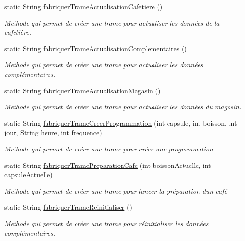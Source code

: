 \begin{DoxyCompactItemize}
static String \hyperlink{classcom_1_1example_1_1ekawa_1_1_protocole_a71e172b9adefa345ebff98663129f833}{fabriquer\+Trame\+Actualisation\+Cafetiere} ()
\begin{DoxyCompactList}\small\item\em Methode qui permet de créer une trame pour actualiser les données de la cafetière. \end{DoxyCompactList}\item 
static String \hyperlink{classcom_1_1example_1_1ekawa_1_1_protocole_a4a7fde713ecc0e7d8653f4610b58f1bf}{fabriquer\+Trame\+Actualisation\+Complementaires} ()
\begin{DoxyCompactList}\small\item\em Methode qui permet de créer une trame pour actualiser les données complémentaires. \end{DoxyCompactList}\item 
static String \hyperlink{classcom_1_1example_1_1ekawa_1_1_protocole_aec8d32eecd3d497bc6c3d94c6e29450c}{fabriquer\+Trame\+Actualisation\+Magasin} ()
\begin{DoxyCompactList}\small\item\em Methode qui permet de créer une trame pour actualiser les données du magasin. \end{DoxyCompactList}\item 
static String \hyperlink{classcom_1_1example_1_1ekawa_1_1_protocole_ac967186423a451ede7e4b9bc16a96222}{fabriquer\+Trame\+Creer\+Programmation} (int capsule, int boisson, int jour, String heure, int frequence)
\begin{DoxyCompactList}\small\item\em Methode qui permet de créer une trame pour créer une programmation. \end{DoxyCompactList}\item 
static String \hyperlink{classcom_1_1example_1_1ekawa_1_1_protocole_a95497419a17cd6ba14663af6c20d7797}{fabriquer\+Trame\+Preparation\+Cafe} (int boisson\+Actuelle, int capsule\+Actuelle)
\begin{DoxyCompactList}\small\item\em Methode qui permet de créer une trame pour lancer la préparation d\textquotesingle{}un café \end{DoxyCompactList}\item 
static String \hyperlink{classcom_1_1example_1_1ekawa_1_1_protocole_a7b6e2d90184a17cdf7ee63b350486b3a}{fabriquer\+Trame\+Reinitialiser} ()
\begin{DoxyCompactList}\small\item\em Methode qui permet de créer une trame pour réinitialiser les données complémentaires. \end{DoxyCompactList}\item 

\end{DoxyCompactItemize}
